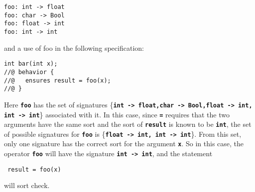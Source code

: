 \documentclass[12pt]{article} %
\newcommand{\reserved}[1]{\textbf{\texttt{#1}}} %
\begin{document}
\begin{verbatim}
foo: int -> float
foo: char -> Bool
foo: float -> int
foo: int -> int
\end{verbatim}

and a use of foo in the following specification:

\begin{verbatim}
int bar(int x);
//@ behavior {
//@   ensures result = foo(x);
//@ }
\end{verbatim}

\noindent Here \reserved{foo} has the set of signatures \{\reserved{int -> float,char
-> Bool,float -> int, int -> int}\} associated with it. In this case,
since \reserved{=} requires that the two arguments have the same sort
and the sort of \reserved{result} is known to be \reserved{int}, the
set of possible signatures for \reserved{foo} is \{\reserved{float ->
int, int -> int}\}. From this set, only one signature has the correct
sort for the argument \reserved{x}. So in this case, the operator
\reserved{foo} will have the signature \reserved{int -> int}, and the
statement \begin{verbatim} result = foo(x) \end{verbatim} will sort
check.
\end{document}
